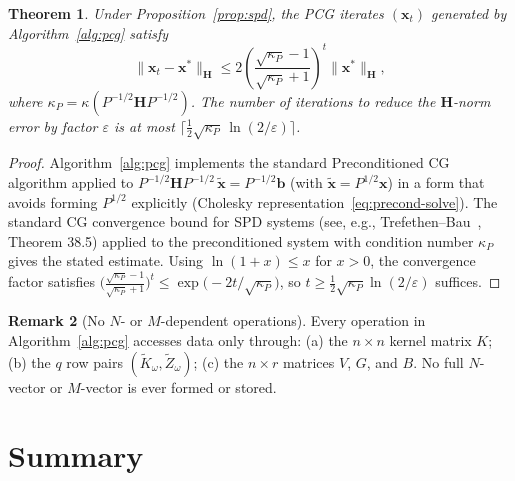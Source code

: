 \documentclass[12pt]{article}
\newtheorem{theorem}{Theorem}
\theoremstyle{definition}
\newtheorem{remark}[theorem]{Remark}
\newcommand{\bH}{\mathbf{H}}
\begin{document}
\begin{theorem}\label{thm:pcg-convergence}
  Under Proposition~\ref{prop:spd}, the PCG iterates
  $(\mathbf{x}_t)$ generated by Algorithm~\ref{alg:pcg} satisfy
  \[
    \|\mathbf{x}_t - \mathbf{x}^*\|_{\bH}
    \leq 2\left(\frac{\sqrt{\kappa_P}-1}{\sqrt{\kappa_P}+1}\right)^t
    \|\mathbf{x}^*\|_{\bH},
  \]
  where $\kappa_P=\kappa(P^{-1/2}\bH P^{-1/2})$.
  The number of iterations to reduce the $\bH$-norm error by factor
  $\varepsilon$ is at most
  $\lceil\tfrac{1}{2}\sqrt{\kappa_P}\,\ln(2/\varepsilon)\rceil$.
\end{theorem}

\begin{proof}
  Algorithm~\ref{alg:pcg} implements the standard Preconditioned CG algorithm
  applied to $P^{-1/2}\bH P^{-1/2}\,\tilde{\mathbf{x}} = P^{-1/2}\mathbf{b}$
  (with $\tilde{\mathbf{x}}=P^{1/2}\mathbf{x}$) in a form that avoids forming
  $P^{1/2}$ explicitly (Cholesky representation~\eqref{eq:precond-solve}).
  The standard CG convergence bound for SPD systems
  (see, e.g., Trefethen--Bau~\cite{trefbau1997}, Theorem 38.5) applied to the
  preconditioned system with condition number $\kappa_P$ gives the stated
  estimate.  Using $\ln(1+x)\leq x$ for $x>0$, the
  convergence factor satisfies
  $\bigl(\frac{\sqrt{\kappa_P}-1}{\sqrt{\kappa_P}+1}\bigr)^t
  \leq \exp\!\bigl(-2t/\sqrt{\kappa_P}\bigr)$,
  so $t\geq \tfrac{1}{2}\sqrt{\kappa_P}\ln(2/\varepsilon)$ suffices.
\end{proof}

\begin{remark}[No $N$- or $M$-dependent operations]
  Every operation in Algorithm~\ref{alg:pcg} accesses data only through:
  (a) the $n\times n$ kernel matrix $K$;
  (b) the $q$ row pairs $(\widetilde{K}_\omega,\widetilde{Z}_\omega)$;
  (c) the $n\times r$ matrices $V$, $G$, and $B$.
  No full $N$-vector or $M$-vector is ever formed or stored.
\end{remark}

\section{Summary}
\end{document}
